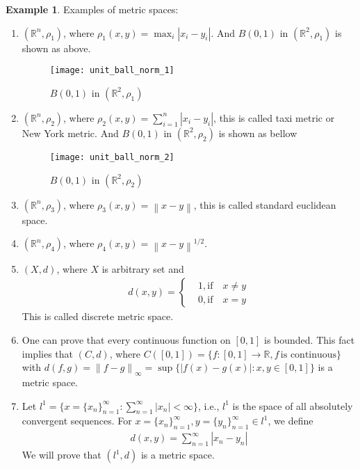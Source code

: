 \documentclass[12pt,leqno]{amsart}
\theoremstyle{definition}
\newtheorem{example}{Example}[section]
\numberwithin{equation}{subsection}
\begin{document}
\begin{example}
Examples of metric spaces:
\begin{enumerate}
    \item $(\mathbb{R}^n,\rho_1)$, where $\rho_1(x,y) = \max_i |x_i-y_i|$. And $B(0,1)$ in $(\mathbb{R}^2,\rho_1)$ is shown as above.\\
    \begin{figure}[h]
        \centering
        \texttt{[image: unit\_ball\_norm\_1]}
        \caption{$B(0,1)$ in $(\mathbb{R}^2,\rho_1)$}
        \label{fig:unit_ball_norm_1}
    \end{figure}
    \item $(\mathbb{R}^n,\rho_2)$, where $\rho_2(x,y) = \sum^n_{i=1} |x_i-y_i|$, this is called taxi metric or New York metric. And $B(0,1)$ in $(\mathbb{R}^2,\rho_2)$ is shown as bellow\\
    \begin{figure}[h]
        \centering
        \texttt{[image: unit\_ball\_norm\_2]}
        \caption{$B(0,1)$ in $(\mathbb{R}^2,\rho_2)$}
        \label{fig:unit_ball_norm_2}
    \end{figure}
    \item $(\mathbb{R}^n,\rho_3)$, where $\rho_3(x,y) = \left\|x-y\right\|$, this is called standard euclidean space.
    \item $(\mathbb{R}^n,\rho_4)$, where $\rho_4(x,y) = \left\|x-y\right\|^{1/2}$.
    \item $(X,d)$, where $X$ is arbitrary set and 
    \begin{align*}
        d(x,y) = \left\{
        \begin{aligned}
        & 1, \text{if} \quad x \neq y\\
        & 0, \text{if} \quad x = y
        \end{aligned}
        \right.
    \end{align*} 
    This is called discrete metric space.
    \item One can prove that every continuous function on $[0,1]$ is bounded. This fact implies that $(C,d)$, where $C([0,1]) = \{f:[0,1]\rightarrow \mathbb{R}, f \, \text{is continuous}\}$ with $d(f,g) = \left\|f-g\right\|_\infty = \sup \{|f(x) - g(x)|: x,y\in[0,1]\}$ is a metric space.
    \item Let $l^1 = \{x = \{x_n\}^\infty_{n=1}: \sum^\infty_{n=1}|x_n| < \infty\}$, i.e., $l^1$ is the space of all absolutely convergent sequences. For $x = \{x_n\}^\infty_{n=1}, y = \{y_n\}^\infty_{n=1} \in l^1$, we define 
    \begin{align*}
        d(x,y) = \sum^\infty_{n=1} |x_n - y_n|
    \end{align*}
    We will prove that $(l^1,d)$ is a metric space.
    

\end{enumerate}
\end{example}
\end{document}
